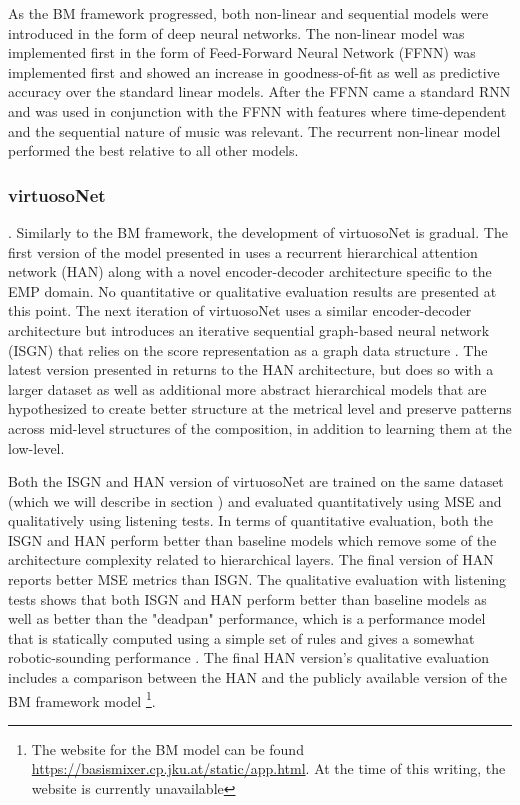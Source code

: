 As the BM framework progressed, both non-linear and sequential models were introduced in the form of deep neural networks. The non-linear model was implemented first in the form of Feed-Forward Neural Network (FFNN) was implemented first and showed an increase in goodness-of-fit as well as predictive accuracy over the standard linear models. After the FFNN came a standard RNN and was used in conjunction with the FFNN with features where time-dependent and the sequential nature of music was relevant. The recurrent non-linear model performed the best relative to all other models. 

\subsubsection{virtuosoNet}
. 
Similarly to the BM framework, the development of virtuosoNet is gradual. The first version of the model presented in \cite{jeong2018virtuosonet} uses a recurrent hierarchical attention network (HAN) along with a novel encoder-decoder architecture specific to the EMP domain. No quantitative or qualitative evaluation results are presented at this point. The next iteration of virtuosoNet uses a similar encoder-decoder architecture but introduces an iterative sequential graph-based neural network (ISGN) that relies on the score representation as a graph data structure \cite{jeong2019graph}. The latest version presented in \cite{jeong2019virtuosonet} returns to the HAN architecture, but does so with a larger dataset as well as additional more abstract hierarchical models that are hypothesized to create better structure at the metrical level and preserve patterns across mid-level structures of the composition, in addition to learning them at the low-level.  

Both the ISGN\cite{jeong2019graph} and HAN\cite{jeong2019virtuosonet} version of virtuosoNet are trained on the same dataset (which we will describe in section ) and evaluated quantitatively using MSE and qualitatively using listening tests. In terms of quantitative evaluation, both the ISGN and HAN perform better than baseline models which remove some of the architecture complexity related to hierarchical layers. The final version of HAN reports better MSE metrics than ISGN. The qualitative evaluation with listening tests shows that both ISGN and HAN perform better than baseline models as well as better than the "deadpan" performance, which is a performance model that is statically computed using a simple set of rules and gives a somewhat robotic-sounding performance . The final HAN version's qualitative evaluation includes a comparison between the HAN and the publicly available version of the BM framework model \footnote{The website for the BM model can be found \href{here}{https://basismixer.cp.jku.at/static/app.html}. At the time of this writing, the website is currently unavailable}. 

